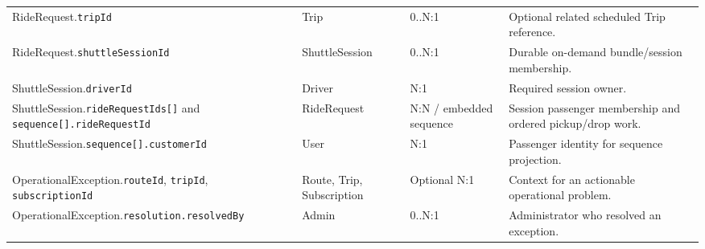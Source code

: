 \documentclass[11pt,a4paper]{article}
\newcommand{\code}[1]{\texttt{#1}}
\begin{document}
\begin{longtable}{p{} p{} p{} p{}}
RideRequest.\code{tripId} & Trip & 0..N:1 & Optional related scheduled Trip reference. \\
RideRequest.\code{shuttleSessionId} & ShuttleSession & 0..N:1 & Durable on-demand bundle/session membership. \\
ShuttleSession.\code{driverId} & Driver & N:1 & Required session owner. \\
ShuttleSession.\code{rideRequestIds[]} and \code{sequence[].rideRequestId} & RideRequest & N:N / embedded sequence & Session passenger membership and ordered pickup/drop work. \\
ShuttleSession.\code{sequence[].customerId} & User & N:1 & Passenger identity for sequence projection. \\
OperationalException.\code{routeId}, \code{tripId}, \code{subscriptionId} & Route, Trip, Subscription & Optional N:1 & Context for an actionable operational problem. \\
OperationalException.\code{resolution.resolvedBy} & Admin & 0..N:1 & Administrator who resolved an exception. \\
\bottomrule
\end{longtable}
\end{document}
